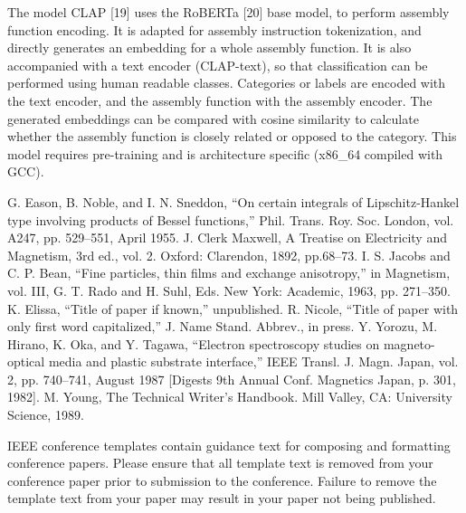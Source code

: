 \documentclass[conference,compsoc]{IEEEtran}
\begin{document}
The model CLAP [19] uses the RoBERTa [20] base model, to perform assembly function encoding.
It is adapted for assembly instruction tokenization, and directly generates an embedding for
a whole assembly function. It is also accompanied with a text encoder (CLAP-text), so that classification can
be performed using human readable classes. Categories or labels are encoded with the text encoder, and the
assembly function with the assembly encoder. The generated embeddings can be compared with cosine similarity to
calculate whether the assembly function is closely related or opposed to the category. This model requires
pre-training and is architecture specific (x86\_64 compiled with GCC).


\begin{thebibliography}{00}
 G. Eason, B. Noble, and I. N. Sneddon, ``On certain integrals of Lipschitz-Hankel type involving products of Bessel functions,'' Phil. Trans. Roy. Soc. London, vol. A247, pp. 529--551, April 1955.
 J. Clerk Maxwell, A Treatise on Electricity and Magnetism, 3rd ed., vol. 2. Oxford: Clarendon, 1892, pp.68--73.
 I. S. Jacobs and C. P. Bean, ``Fine particles, thin films and exchange anisotropy,'' in Magnetism, vol. III, G. T. Rado and H. Suhl, Eds. New York: Academic, 1963, pp. 271--350.
 K. Elissa, ``Title of paper if known,'' unpublished.
 R. Nicole, ``Title of paper with only first word capitalized,'' J. Name Stand. Abbrev., in press.
 Y. Yorozu, M. Hirano, K. Oka, and Y. Tagawa, ``Electron spectroscopy studies on magneto-optical media and plastic substrate interface,'' IEEE Transl. J. Magn. Japan, vol. 2, pp. 740--741, August 1987 [Digests 9th Annual Conf. Magnetics Japan, p. 301, 1982].
 M. Young, The Technical Writer's Handbook. Mill Valley, CA: University Science, 1989.
\end{thebibliography}
\vspace{12pt}
\color{red}
IEEE conference templates contain guidance text for composing and formatting conference papers. Please ensure that all template text is removed from your conference paper prior to submission to the conference. Failure to remove the template text from your paper may result in your paper not being published.
\end{document}
